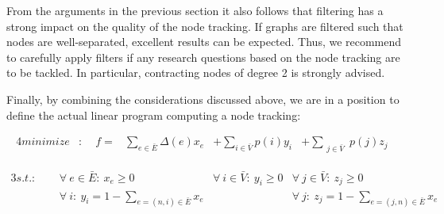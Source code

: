 	      From the arguments in the previous section it also follows that filtering has a strong impact on the quality of the node tracking. If graphs are filtered such that nodes are well-separated, excellent results can be expected. Thus, we recommend to carefully apply filters if any research questions based on the node tracking are to be tackled. In particular, contracting nodes of degree 2 is strongly advised.

	      Finally, by combining the considerations discussed above, we are in a position to define the actual linear program computing a node tracking:

	      \begin{alignat*}{4}
	        minimize & : & \ \ f = &\sum_{ e \in \bar{E} } \Delta(e) x_{e}  &+  \sum_{ i \in \bar{V}} p(i) y_{i} & +   \sum_{ \substack{j \in \bar{V}}} p(j) z_{j} &  
	      \end{alignat*}

	      \begin{alignat*}{3}
	          s.t.:
	                & \ \     & \forall \ e \in \bar{E} : \ x_{e} \ge 0  \quad \quad    & \forall \ i \in \bar{V} : \ y_{i} \ge 0                                          & \forall \ j \in \bar{V} : \ z_{j} \ge 0                                             \\
	                & \ \     & \forall \ i: \ y_{i} = 1 - \sum_{e = (n,i) \in \bar{E}} x_{e}                                          &                                                     & \forall \ j: \ z_{j} = 1 - \sum_{e = (j,n) \in \bar{E}} x_{e}                     
	       \end{alignat*}

